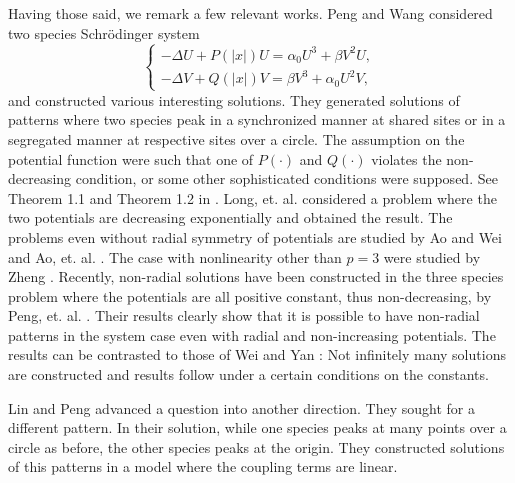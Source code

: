 \documentclass{amsart}
\theoremstyle{definition}
\theoremstyle{remark}
\numberwithin{equation}{section}
\begin{document}
Having those said, we remark a few relevant works. Peng and Wang \cite{peng_wang_2013} considered two species Schr\"odinger system 
\begin{equation*}\begin{cases}
 -\Delta U+ P(|x|)U = \alpha_0 U^3 + \beta V^2 U,\\
 -\Delta V+ Q(|x|)V = \beta V^3 + \alpha_0 U^2 V,
\end{cases}\end{equation*}
and constructed various interesting solutions. They generated solutions of patterns where two species peak in a synchronized manner at shared sites or in a segregated manner at respective sites over a circle. The assumption on the potential function were such that one of $P(\cdot)$ and $Q(\cdot)$ violates the non-decreasing condition, or some other sophisticated conditions were supposed. See Theorem 1.1 and Theorem 1.2 in \cite{peng_wang_2013}. Long, et. al. \cite{long_tang_yang_2020} considered a problem where the two potentials are decreasing exponentially and obtained the result. The problems even without radial symmetry of potentials are studied by Ao and Wei \cite{ao_wei_2014} and Ao, et. al. \cite{ao_wang_yao_2016}. The case with nonlinearity other than $p=3$ were studied by Zheng \cite{zheng_2017}. Recently, non-radial solutions have been constructed in the three species problem where the potentials are all positive constant, thus non-decreasing, by Peng, et. al. \cite{peng_wang_wang_2019}. Their results clearly show that it is possible to have non-radial patterns in the system case even with radial and non-increasing potentials. %
The results can be contrasted to those of Wei and Yan \cite{wei_yan_2014}: Not infinitely many solutions are constructed and results follow under a certain conditions on the constants.


Lin and Peng \cite{lin_peng_2014} advanced a question into another direction. They sought for a different pattern. In their solution, while one species peaks at many points over a circle as before, the other species peaks at the origin. They constructed solutions of this patterns in a model where the coupling terms are linear.
\end{document}
